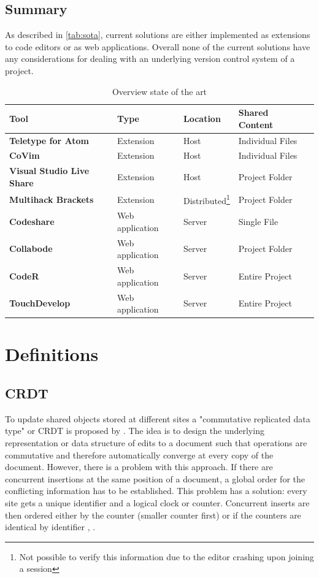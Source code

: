 \newpage
\subsection{Summary}
As described in \autoref{tab:sota}, current solutions are either implemented as extensions to code editors or as web applications. Overall none of the current solutions have any considerations for dealing with an underlying version control system of a project.
\begin{table}
	\begin{minipage}{6cm}
		\begin{tabular}{| >{\bfseries}l | l | l | l | l | }
			\hline
				\rowcolor{orange} \bfseries Tool & \bfseries Type & \bfseries Location & \bfseries Shared Content \\
			\hline
			\hline
				Teletype for Atom & Extension & Host & Individual Files \\\hline
				CoVim & Extension & Host & Individual Files \\\hline
				Visual Studio Live Share & Extension & Host & Project Folder \\\hline
				Multihack Brackets & Extension &  Distributed\footnote{Not possible to verify this information due to the editor crashing upon joining a session} & Project Folder \\\hline
				Codeshare & Web application & Server & Single File \\\hline
				Collabode & Web application & Server & Project Folder \\\hline
				CodeR & Web application & Server & Entire Project \\\hline
				TouchDevelop & Web application & Server & Entire Project \\
			\hline
		\end{tabular}
	\end{minipage}
		\caption{Overview state of the art}
		\label{tab:sota}
	\end{table}

\section{Definitions}

\subsection{CRDT}
\label{sec:CRDT}
To update shared objects stored at different sites a "commutative replicated data type" or CRDT is proposed by \cite{PreguicaMarquesShapiroLetia:2009}. The idea is to design the underlying representation or data structure of edits to a document such that operations are commutative and therefore automatically converge at every copy of the document.
However, there is a problem with this approach. If there are concurrent insertions at the same position of a document, a global order for the conflicting information has to be established. This problem has a solution: every site gets a unique identifier and a logical clock or counter. Concurrent inserts are then ordered either by the counter (smaller counter first) or if the counters are identical by identifier \cite{PreguicaMarquesShapiroLetia:2009}, \cite{Oster:2006:DataconsistencyforP2Pcollaborativeediting}.

